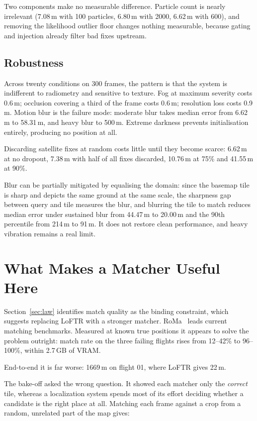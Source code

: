 \documentclass[conference]{IEEEtran}
\begin{document}
Two components make no measurable difference. Particle count is nearly
irrelevant (7.08\,m with 100 particles,
6.80\,m with 2000, 6.62\,m with 600), and removing the likelihood outlier floor
changes nothing measurable, because gating and injection already filter bad
fixes upstream.

\subsection{Robustness}
Across twenty conditions on 300 frames, the pattern is that the system is
indifferent to radiometry and sensitive to texture. Fog at maximum severity
costs 0.6\,m; occlusion covering a third of the frame costs 0.6\,m; resolution
loss costs 0.9\,m. Motion blur is the failure mode: moderate blur takes median
error from 6.62\,m to 58.31\,m, and heavy blur to 500\,m. Extreme darkness
prevents initialisation entirely, producing no position at all.

Discarding satellite fixes at random costs little until they become scarce:
6.62\,m at no dropout, 7.38\,m with half of all fixes discarded, 10.76\,m at
75\% and 41.55\,m at 90\%.

Blur can be partially mitigated by equalising the domain: since the basemap
tile is sharp and depicts the same ground at the same scale, the sharpness gap
between query and tile measures the blur, and blurring the tile to match
reduces median error under sustained blur from 44.47\,m to 20.00\,m and the
90th percentile from 214\,m to 91\,m. It does not restore clean performance,
and heavy vibration remains a real limit.

\section{What Makes a Matcher Useful Here}
\label{sec:matcher}

Section~\ref{sec:law} identifies match quality as the binding constraint, which
suggests replacing LoFTR with a stronger matcher. RoMa~\cite{roma} leads
current matching benchmarks. Measured at known true positions it appears to
solve the problem outright: match rate on the three failing flights rises from
12--42\% to 96--100\%, within 2.7\,GB of VRAM.

End-to-end it is far worse: 1669\,m on flight 01, where LoFTR gives 22\,m.

The bake-off asked the wrong question. It showed each matcher only the
\emph{correct} tile, whereas a localization system spends most of its effort
deciding whether a candidate is the right place at all. Matching each frame
against a crop from a random, unrelated part of the map gives:
\end{document}
